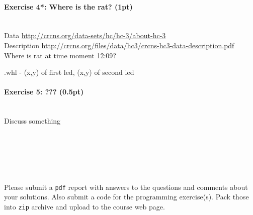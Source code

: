 \documentclass[a4paper,11pt]{article}
\newenvironment{exercise}[3]{\paragraph{Exercise #1: #2 (#3pt)}\ \\}{
\medskip}
\begin{document}
\begin{exercise}{4*}{Where is the rat?}{1}
Data \url{http://crcns.org/data-sets/hc/hc-3/about-hc-3}\\
Description \url{http://crcns.org/files/data/hc3/crcns-hc3-data-description.pdf}\\
Where is rat at time moment 12:09?


.whl - (x,y) of first led, (x,y) of second led
\end{exercise}

\begin{exercise}{5}{???}{0.5}
Discuss something
\end{exercise}



\ \\
\ \\
\ \\
\ \\
\ \\
Please submit a \texttt{pdf} report with answers to the questions and comments about your solutions. Also submit a code for the programming exercise(s). Pack those into \texttt{zip} archive and upload to the course web page.
\end{document}
